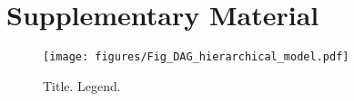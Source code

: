 \section*{Supplementary Material}

\begin{figure}[H]
    \centering
    \texttt{[image: figures/Fig\_DAG\_hierarchical\_model.pdf]} 
    \caption{Title.
        Legend.
    } \label{fig:hierarchical}
\end{figure}
